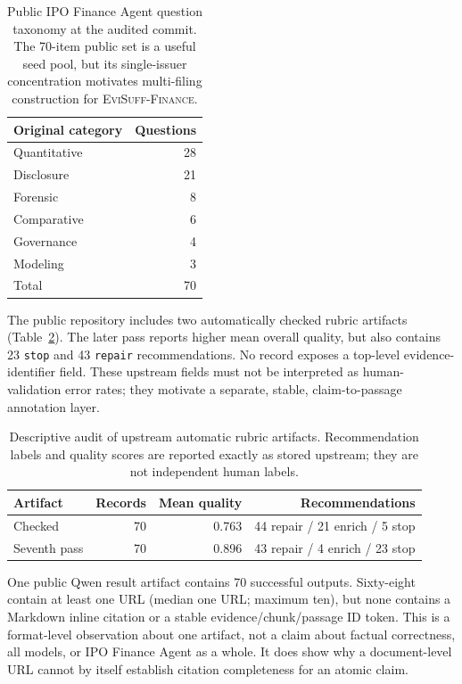 \documentclass{article}
\newcommand{\benchmark}{\textsc{EviSuff-Finance}}
\begin{document}
\begin{table}[t]
\caption{Public IPO Finance Agent question taxonomy at the audited commit. The
70-item public set is a useful seed pool, but its single-issuer concentration
motivates multi-filing construction for \benchmark{}.}
\label{tab:taxonomy}
\centering
\begin{tabular}{lr}
\toprule
Original category & Questions \\
\midrule
Quantitative & 28 \\
Disclosure & 21 \\
Forensic & 8 \\
Comparative & 6 \\
Governance & 4 \\
Modeling & 3 \\
\midrule
Total & 70 \\
\bottomrule
\end{tabular}
\end{table}

The public repository includes two automatically checked rubric artifacts
(Table~\ref{tab:rubrics}). The later pass reports higher mean overall quality,
but also contains 23 \texttt{stop} and 43 \texttt{repair} recommendations. No
record exposes a top-level evidence-identifier field. These upstream fields
must not be interpreted as human-validation error rates; they motivate a
separate, stable, claim-to-passage annotation layer.

\begin{table}[t]
\caption{Descriptive audit of upstream automatic rubric artifacts. Recommendation
labels and quality scores are reported exactly as stored upstream; they are not
independent human labels.}
\label{tab:rubrics}
\centering
\small
\begin{tabular}{lrrr}
\toprule
Artifact & Records & Mean quality & Recommendations \\
\midrule
Checked & 70 & 0.763 & 44 repair / 21 enrich / 5 stop \\
Seventh pass & 70 & 0.896 & 43 repair / 4 enrich / 23 stop \\
\bottomrule
\end{tabular}
\end{table}

One public Qwen result artifact contains 70 successful outputs. Sixty-eight
contain at least one URL (median one URL; maximum ten), but none contains a
Markdown inline citation or a stable evidence/chunk/passage ID token. This is a
format-level observation about one artifact, not a claim about factual
correctness, all models, or IPO Finance Agent as a whole. It does show why a
document-level URL cannot by itself establish citation completeness for an
atomic claim.
\end{document}
